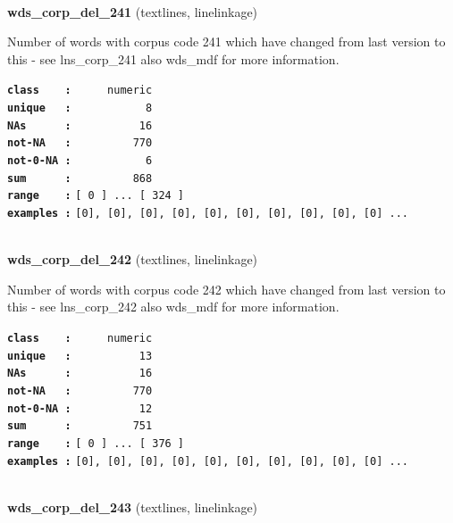 \documentclass[]{article}
\begin{document}
~

\textbf{wds\_corp\_del\_241} (textlines, linelinkage)

Number of words with corpus code 241 which have changed from last
version to this - see lns\_corp\_241 also wds\_mdf for more information.

\textbf{\texttt{class\ \ \ \ :}} \texttt{~~~~~numeric}\\
\textbf{\texttt{unique\ \ \ :}} \texttt{~~~~~~~~~~~8}\\
\textbf{\texttt{NAs\ \ \ \ \ \ :}} \texttt{~~~~~~~~~~16}\\
\textbf{\texttt{not-NA\ \ \ :}} \texttt{~~~~~~~~~770}\\
\textbf{\texttt{not-0-NA\ :}} \texttt{~~~~~~~~~~~6}\\
\textbf{\texttt{sum\ \ \ \ \ \ :}} \texttt{~~~~~~~~~868}\\
\textbf{\texttt{range\ \ \ \ :}}
\texttt{{[}\ 0\ {]}\ ...\ {[}\ 324\ {]}}\\
\textbf{\texttt{examples\ :}}
\texttt{{[}0{]},\ {[}0{]},\ {[}0{]},\ {[}0{]},\ {[}0{]},\ {[}0{]},\ {[}0{]},\ {[}0{]},\ {[}0{]},\ {[}0{]}\ ...}\\

~

\textbf{wds\_corp\_del\_242} (textlines, linelinkage)

Number of words with corpus code 242 which have changed from last
version to this - see lns\_corp\_242 also wds\_mdf for more information.

\textbf{\texttt{class\ \ \ \ :}} \texttt{~~~~~numeric}\\
\textbf{\texttt{unique\ \ \ :}} \texttt{~~~~~~~~~~13}\\
\textbf{\texttt{NAs\ \ \ \ \ \ :}} \texttt{~~~~~~~~~~16}\\
\textbf{\texttt{not-NA\ \ \ :}} \texttt{~~~~~~~~~770}\\
\textbf{\texttt{not-0-NA\ :}} \texttt{~~~~~~~~~~12}\\
\textbf{\texttt{sum\ \ \ \ \ \ :}} \texttt{~~~~~~~~~751}\\
\textbf{\texttt{range\ \ \ \ :}}
\texttt{{[}\ 0\ {]}\ ...\ {[}\ 376\ {]}}\\
\textbf{\texttt{examples\ :}}
\texttt{{[}0{]},\ {[}0{]},\ {[}0{]},\ {[}0{]},\ {[}0{]},\ {[}0{]},\ {[}0{]},\ {[}0{]},\ {[}0{]},\ {[}0{]}\ ...}\\

~

\textbf{wds\_corp\_del\_243} (textlines, linelinkage)
\end{document}
